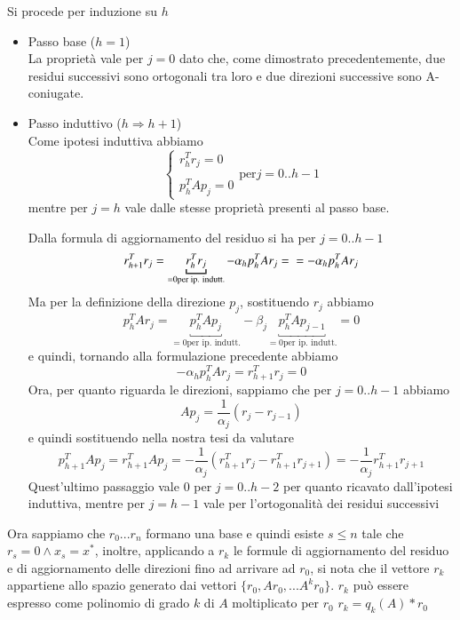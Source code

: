 \begin{thproof}

Si procede per induzione su $h$
\begin{itemize}
\item Passo base ($h=1$)\\ La proprietà vale per $j=0$ dato che, come
dimostrato precedentemente, due residui successivi sono ortogonali tra
loro e due direzioni successive sono A-coniugate.
\item Passo induttivo ($h \Rightarrow h+1$) \\ Come ipotesi induttiva
abbiamo
$$\left\{
\begin{array}{ll} r_{h}^{T} r_{j} = 0\\ \\ p_{h}^{T} A p_{j} = 0
\end{array} \right.  \text{per} j=0..h-1
$$
mentre per $j=h$ vale dalle stesse proprietà presenti al passo base.

Dalla formula di aggiornamento del residuo si ha per $j=0..h-1$
$$r_{h+1}^{T}r_{j} =\underbracket{ r_{h}^{T}r_{j}}_{= 0 \text {per ip. indutt.}} - \alpha_{h}p_{h}^{T}Ar_{j}=   \\
=-\alpha_{h}p_{h}^{T}Ar_{j}
$$
Ma per la definizione della direzione $p_{j}$, sostituendo $r_{j}$ abbiamo
$$
p_{h}^{T}Ar_{j}=\underbracket{p_{h}^{T}Ap_{j}}_{=0 \text{per
ip. indutt.}} - \beta_{j}\underbracket{p_{h}^{T}Ap_{j-1}}_{=0
\text{per ip. indutt.}} = 0
$$
e quindi, tornando alla formulazione precedente abbiamo
$$
-\alpha_{h}p_{h}^{T}Ar_{j}=r_{h+1}^{T} r_{j} = 0
$$
Ora, per quanto riguarda le direzioni, sappiamo che per $j=0..h-1$
abbiamo
$$Ap_{j}=\frac{1}{\alpha_{j}}(r_{j} - r_{j-1})$$
e quindi sostituendo nella nostra tesi da valutare
$$p_{h+1}^{T}Ap_{j}=r_{h+1}^{T}Ap_{j}=-\frac{1}{\alpha_{j}}(r_{h+1}^{T}r_{j}-r_{h+1}^{T}r_{j+1})=-\frac{1}{\alpha_{j}}r_{h+1}^{T}r_{j+1}$$
Quest'ultimo passaggio vale 0 per $j=0..h-2$ per quanto ricavato
dall'ipotesi induttiva, mentre per $j=h-1$ vale per l'ortogonalità dei
residui successivi
\end{itemize}
\end{thproof} Ora sappiamo che $r_{0}... r_{n}$ formano una base e
quindi esiste $s \leq n$ tale che $r_{s} = 0 \wedge x_{s} = x^{*} $,
inoltre, applicando a $r_{k}$ le formule di aggiornamento del residuo
e di aggiornamento delle direzioni fino ad arrivare ad $r_{0}$, si
nota che il vettore $r_{k}$ appartiene allo spazio generato dai
vettori $\{ r_{0}, Ar_{0}, ... A^{k}r_{0} \}$.  $r_{k}$ può essere
espresso come polinomio di grado $k$ di $A$ moltiplicato per $r_{0}$
$r_{k}=q_{k}(A)*r_{0}$

